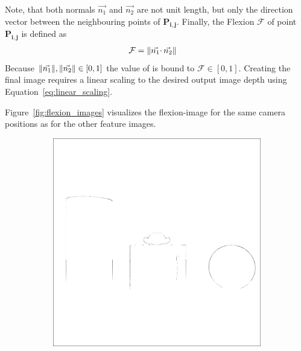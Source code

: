 Note, that both normals $\vec{n_1}$ and $\vec{n_2}$ are not unit length, but only the direction vector between the neighbouring points of $\mathbf{P_{i,j}}$.
Finally, the Flexion $\mathcal{F}$ of point $\mathbf{P_{i,j}}$ is defined as
\begin{align}
    \mathcal{F} &= \lVert\vec{n_1} \cdotp \vec{n_2}\rVert
\end{align}
Because $\lVert\vec{n_1}\rVert,\lVert\vec{n_2}\rVert \in [0,1]$ the value of is bound to $\mathcal{F} \in [0, 1]$.
Creating the final image requires a linear scaling to the desired output image depth using Equation~\ref{eq:linear_scaling}.

Figure~\ref{fig:flexion_images} visualizes the \Gls{flexion-image} for the same camera positions as for the other feature images.
\begin{figure}[H]
    \begin{subfigure}[t]{0.32\textwidth}
        \includegraphics[width=\linewidth]{chapter04/img/flexion-0001.png}
    \end{subfigure}
    \begin{subfigure}[t]{0.32\textwidth}

\end{subfigure}
\end{figure}
